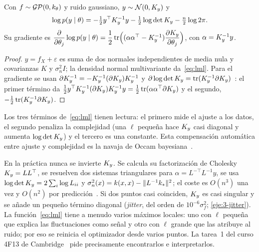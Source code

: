 \begin{proposicion}\label{prop:lml}
Con $f\sim\mathcal{GP}(0,k_\theta)$ y ruido gaussiano, $y\sim\mathcal{N}(0,K_{y})$ y
\begin{equation}\label{eq:lml}
\log p(y\mid\theta)=-\tfrac12y^\top K_{y}^{-1}y-\tfrac12\log\det K_{y}-\tfrac n2\log 2\pi .
\end{equation}
Su gradiente es $\dfrac{\partial}{\partial\theta_j}\log p(y\mid\theta)=\dfrac12\operatorname{tr}\Bigl((\alpha\alpha^\top-K_{y}^{-1})\dfrac{\partial K_{y}}{\partial\theta_j}\Bigr)$, con $\alpha=K_{y}^{-1}y$.
\end{proposicion}

\begin{proof}
$y=f_X+\varepsilon$ es suma de dos normales independientes de media nula y covarianzas $K$ y $\sigma_n^2I$; la densidad normal multivariante da~\eqref{eq:lml}. Para el gradiente se usan $\partial K_{y}^{-1}=-K_{y}^{-1}(\partial K_{y})K_{y}^{-1}$ y $\partial\log\det K_{y}=\operatorname{tr}(K_{y}^{-1}\partial K_{y})$~\cite[apéndice~A]{rw}: el primer término da $\tfrac12y^\top K_{y}^{-1}(\partial K_{y})K_{y}^{-1}y=\tfrac12\operatorname{tr}(\alpha\alpha^\top\partial K_{y})$ y el segundo, $-\tfrac12\operatorname{tr}(K_{y}^{-1}\partial K_{y})$.
\end{proof}

Los tres términos de~\eqref{eq:lml} tienen lectura: el primero mide el ajuste a los datos, el segundo penaliza la complejidad (una $\ell$ pequeña hace $K_{y}$ casi diagonal y aumenta $\log\det K_{y}$) y el tercero es una constante. Esta compensación automática entre ajuste y complejidad es la navaja de Occam bayesiana~\cite[cap.~5]{rw}.

\begin{observacion}\label{obs:cholesky}
En la práctica nunca se invierte $K_{y}$. Se calcula su factorización de Cholesky $K_{y}=LL^\top$, se resuelven dos sistemas triangulares para $\alpha=L^{-\top}L^{-1}y$, se usa $\log\det K_{y}=2\sum_i\log L_{ii}$ y $\sigma_n^2(x)=k(x,x)-\lVert L^{-1}k_*\rVert^2$; el coste es $O(n^3)$ una vez y $O(n^2)$ por predicción~\cite[cap.~2]{rw}. Si dos puntos casi coinciden, $K_{y}$ es casi singular y se añade un pequeño término diagonal (\emph{jitter}, del orden de $10^{-6}\sigma_f^2$; \cref{eje:3-jitter}). La función~\eqref{eq:lml} tiene a menudo varios máximos locales: uno con $\ell$ pequeña que explica las fluctuaciones como señal y otro con $\ell$ grande que las atribuye al ruido; por eso se reinicia el optimizador desde varios puntos. La tarea~1 del curso 4F13 de Cambridge~\cite{cam4f13} pide precisamente encontrarlos e interpretarlos.
\end{observacion}

